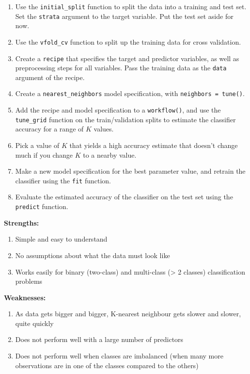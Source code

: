 \documentclass[
]{krantz}
\providecommand{\tightlist}{%
  \setlength{\itemsep}{0pt}\setlength{\parskip}{0pt}}
\begin{document}
\begin{enumerate}
\def\labelenumi{\arabic{enumi}.}
\tightlist
\item
  Use the \texttt{initial\_split} function to split the data into a training and test set. Set the \texttt{strata} argument to the target variable. Put the test set aside for now.
\item
  Use the \texttt{vfold\_cv} function to split up the training data for cross validation.
\item
  Create a \texttt{recipe} that specifies the target and predictor variables, as well as preprocessing steps for all variables. Pass the training data as the \texttt{data} argument of the recipe.
\item
  Create a \texttt{nearest\_neighbors} model specification, with \texttt{neighbors\ =\ tune()}.
\item
  Add the recipe and model specification to a \texttt{workflow()}, and use the \texttt{tune\_grid} function on the train/validation splits to estimate the classifier accuracy for a range of \(K\) values.
\item
  Pick a value of \(K\) that yields a high accuracy estimate that doesn't change much if you change \(K\) to a nearby value.
\item
  Make a new model specification for the best parameter value, and retrain the classifier using the \texttt{fit} function.
\item
  Evaluate the estimated accuracy of the classifier on the test set using the \texttt{predict} function.
\end{enumerate}

\textbf{Strengths:}

\begin{enumerate}
\def\labelenumi{\arabic{enumi}.}
\tightlist
\item
  Simple and easy to understand
\item
  No assumptions about what the data must look like
\item
  Works easily for binary (two-class) and multi-class (\textgreater{} 2 classes) classification problems
\end{enumerate}

\textbf{Weaknesses:}

\begin{enumerate}
\def\labelenumi{\arabic{enumi}.}
\tightlist
\item
  As data gets bigger and bigger, K-nearest neighbour gets slower and slower, quite quickly
\item
  Does not perform well with a large number of predictors
\item
  Does not perform well when classes are imbalanced (when many more observations are in one of the classes compared to the others)
\end{enumerate}
\end{document}
